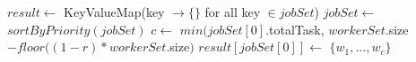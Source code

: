 $result \gets$
KeyValueMap(key $\to \{\}$ for all key $\in jobSet$)\;
$jobSet \gets$ $sortByPriority(jobSet)$\;
$c \gets$ $min(jobSet[0]$.totalTask, $workerSet$.size$-floor((1-r) *
workerSet.$size$)$\;
$result[jobSet[0]] \gets$ $\{w_1, ..., w_c\}$\;
\;

